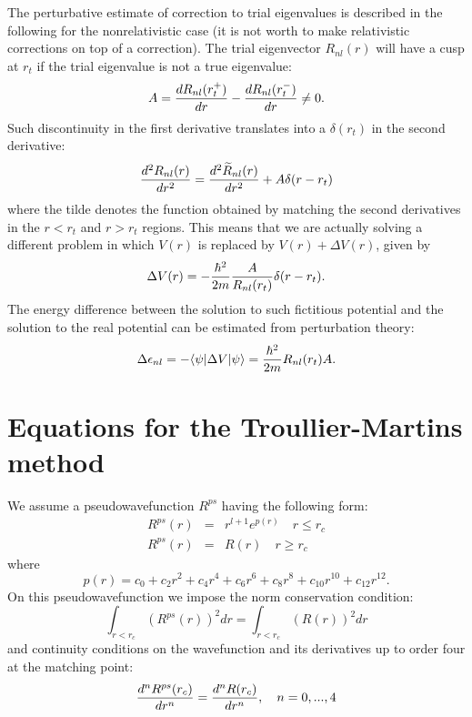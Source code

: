 \documentclass[12pt,a4paper]{article}
\begin{document}
The perturbative estimate of correction to trial eigenvalues is described in
the following for the nonrelativistic case (it is not worth to make relativistic
corrections on top of a correction). The trial eigenvector $R_{nl}(r)$ will have 
a cusp at $r_t$ if the trial eigenvalue is not a true eigenvalue:
\begin{equation}
A = {d R_{nl}(r_t^+)\over dr} - {d R_{nl}(r_t^-)\over dr} \ne 0.
\end{equation}
Such discontinuity in the first derivative translates into a
$\delta(r_t)$ in the second derivative:
\begin{equation}
{d^2  R_{nl}(r)\over dr^2} = {d^2 \widetilde R_{nl}(r)\over dr^2}
  + A \delta(r-r_t)
\end{equation}
where the tilde denotes the function obtained by matching the
second derivatives in the $r< r_t$ and $r> r_t$ regions.
This means that we are actually solving a different problem in which 
$V(r)$ is replaced by $V(r)+\Delta V(r)$, 
given by
\begin{equation}
 \Delta V(r) = -{\hbar^2 \over 2m} {A\over R_{nl}(r_t)}\delta(r-r_t).
\end{equation}
The energy difference between the solution to such fictitious potential 
and the solution to the real potential can be estimated from
perturbation theory:
\begin{equation}
 \Delta\epsilon_{nl} = - \langle\psi|\Delta V |\psi\rangle
                     =   {\hbar^2 \over 2m} R_{nl}(r_t) A.
\end{equation}

\section{Equations for the Troullier-Martins method}

We assume a pseudowavefunction $R^{ps}$ having the following form:
\begin{eqnarray}
R^{ps}(r)&=&r^{l+1}e^{p(r)} \quad r\le r_c \\
R^{ps}(r)&=&R(r)         \quad r\ge r_c
\end{eqnarray}
where
\begin{equation}
p(r)=c_0+c_2r^2+c_4r^4+c_6r^6+c_8r^8+c_{10}r^{10}+c_{12}r^{12}.
\end{equation}
On this pseudowavefunction we impose the norm conservation
condition:
\begin{equation}
\int_{r<r_c} (R^{ps}(r))^2 dr=\int_{r<r_c} (R(r))^2 dr
\end{equation}
and continuity conditions on the wavefunction and its derivatives up
to order four at the matching point:
\begin{equation}
{d^nR^{ps}(r_c)\over dr^n}={d^nR(r_c)\over dr^n}, \quad n=0,...,4
\end{equation}
\end{document}
